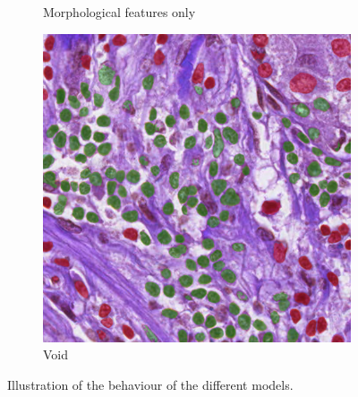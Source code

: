 \begin{figure}[H]
\begin{subfigure}[b]{0.45\textwidth}
    \caption{Morphological features only}
    \label{fig:monusac-no-prior1}
  \end{subfigure}
  \hfill
  \begin{subfigure}[b]{0.45\textwidth}
    \includegraphics[width=\textwidth]{imgs/qual/monusac/void1.png}
    \caption{Void}
    \label{fig:monusac-void1}
  \end{subfigure}
  \caption{Illustration of the behaviour of the different models.}
  \label{fig:monusac-qual1}
\end{figure}

